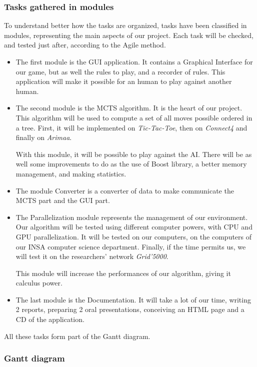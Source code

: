 \subsubsection{Tasks gathered in modules}

To understand better how the tasks are organized, tasks have been classified in modules, representing the main aspects of our project. Each task will be checked, and tested just after, according to the Agile method.

\begin{itemize}
  \item The first module is the GUI application. It contains a Graphical Interface for our game, but as well the rules to play, and a recorder of rules. 
This application will make it possible for an human to play against another human.
  \item The second module is the MCTS algorithm. It is the heart of our project. This algorithm will be used to compute a set of all moves possible ordered in a tree. First, it will be implemented on \textit{Tic-Tac-Toe}, then on \textit{Connect4} and finally on \textit{Arimaa}. 

With this module, it will be possible to play against the AI.
There will be as well some improvements to do as the use of Boost library, a better memory management, and making statistics.
  \item The module Converter is a converter of data to make communicate the MCTS part and the GUI part.
  \item The Parallelization module represents the management of our environment. Our algorithm will be tested using different computer powers, with CPU and GPU parallelization. It will be tested on our computers, on the computers of our INSA computer science department. Finally, if the time permits us, we will test it on the researchers' network \textit{Grid'5000}. 

This module will increase the performances of our algorithm, giving it calculus power.
  \item The last module is the Documentation. It will take a lot of our time, writing 2 reports, preparing 2 oral presentations, conceiving an HTML page and a CD of the application.
\end{itemize}
All these tasks form part of the Gantt diagram.
\subsubsection{Gantt diagram}

